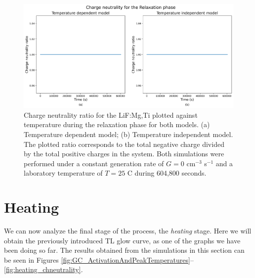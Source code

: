 \begin{figure}
    \centering
    \includegraphics[width=\textwidth]{Images/Relaxation Charge neutrality.png}
    \caption[Charge neutrality ratio evolution during the relaxation phase for both models.]{Charge neutrality ratio for the LiF:Mg,Ti plotted against temperature during the relaxation phase for both models. (a) Temperature dependent model; (b) Temperature independent model. The plotted ratio corresponds to the total negative charge divided by the total positive charges in the system. Both simulations were performed under a constant generation rate of $G = 0$ cm$^{-3}$ s$^{-1}$ and a laboratory temperature of $T = 25$ \textdegree C during 604,800 seconds.}
    \label{fig:relaxation_chneutrality}
\end{figure}

\vspace{10pt}

\section{Heating}\label{sec:heating}

We can now analyze the final stage of the process, the \textit{heating} stage. Here we will obtain the previously introduced TL glow curve, as one of the graphs we have been doing so far. The results obtained from the simulations in this section can be seen in Figures \ref{fig:GC_ActivationAndPeakTemperatures}--\ref{fig:heating_chneutrality}. 

